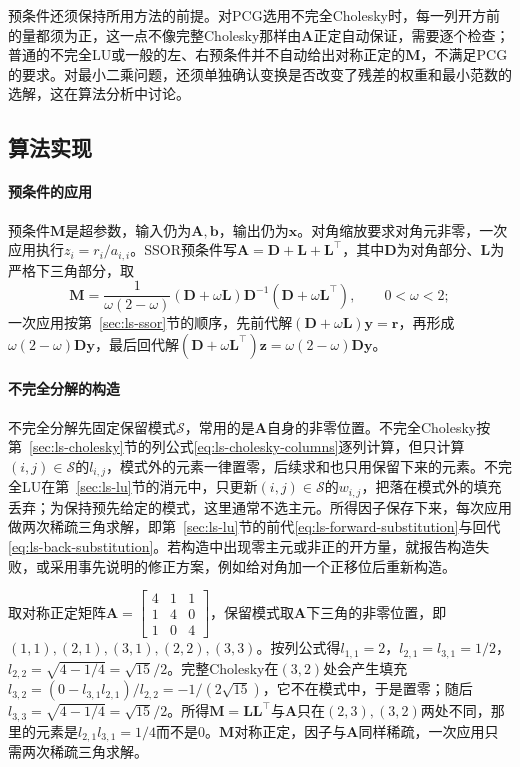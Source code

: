 预条件还须保持所用方法的前提。对PCG选用不完全Cholesky时，每一列开方前的量都须为正，这一点不像完整Cholesky那样由$\bm A$正定自动保证，需要逐个检查；普通的不完全LU或一般的左、右预条件并不自动给出对称正定的$\bm M$，不满足PCG的要求。对最小二乘问题，还须单独确认变换是否改变了残差的权重和最小范数的选解，这在算法分析中讨论。

\subsection{算法实现}

\paragraph{预条件的应用}
预条件$\bm M$是超参数，输入仍为$\bm A,\bm b$，输出仍为$\bm x$。对角缩放要求对角元非零，一次应用执行$z_i=r_i/a_{i,i}$。SSOR预条件写$\bm A=\bm D+\bm L+\bm L^\top$，其中$\bm D$为对角部分、$\bm L$为严格下三角部分，取
\[
 \bm M=\frac1{\omega(2-\omega)}(\bm D+\omega\bm L)\bm D^{-1}(\bm D+\omega\bm L^\top),\qquad 0<\omega<2 ;
\]
一次应用按第~\ref{sec:ls-ssor}节的顺序，先前代解$(\bm D+\omega\bm L)\bm y=\bm r$，再形成$\omega(2-\omega)\bm D\bm y$，最后回代解$(\bm D+\omega\bm L^\top)\bm z=\omega(2-\omega)\bm D\bm y$。

\paragraph{不完全分解的构造}
不完全分解先固定保留模式$\mathcal S$，常用的是$\bm A$自身的非零位置。不完全Cholesky按第~\ref{sec:ls-cholesky}节的列公式\eqref{eq:ls-cholesky-columns}逐列计算，但只计算$(i,j)\in\mathcal S$的$l_{i,j}$，模式外的元素一律置零，后续求和也只用保留下来的元素。不完全LU在第~\ref{sec:ls-lu}节的消元中，只更新$(i,j)\in\mathcal S$的$w_{i,j}$，把落在模式外的填充丢弃；为保持预先给定的模式，这里通常不选主元。所得因子保存下来，每次应用做两次稀疏三角求解，即第~\ref{sec:ls-lu}节的前代\eqref{eq:ls-forward-substitution}与回代\eqref{eq:ls-back-substitution}。若构造中出现零主元或非正的开方量，就报告构造失败，或采用事先说明的修正方案，例如给对角加一个正移位后重新构造。

\begin{example}[一个不完全Cholesky分解]
\label{ex:ls-incomplete-cholesky}
取对称正定矩阵$\bm A=\left[\begin{smallmatrix}4&1&1\\1&4&0\\1&0&4\end{smallmatrix}\right]$，保留模式取$\bm A$下三角的非零位置，即$(1,1),(2,1),(3,1),(2,2),(3,3)$。按列公式得$l_{1,1}=2$，$l_{2,1}=l_{3,1}=1/2$，$l_{2,2}=\sqrt{4-1/4}=\sqrt{15}/2$。完整Cholesky在$(3,2)$处会产生填充$l_{3,2}=(0-l_{3,1}l_{2,1})/l_{2,2}=-1/(2\sqrt{15})$，它不在模式中，于是置零；随后$l_{3,3}=\sqrt{4-1/4}=\sqrt{15}/2$。所得$\bm M=\bm L\bm L^\top$与$\bm A$只在$(2,3),(3,2)$两处不同，那里的元素是$l_{2,1}l_{3,1}=1/4$而不是$0$。$\bm M$对称正定，因子与$\bm A$同样稀疏，一次应用只需两次稀疏三角求解。
\end{example}

